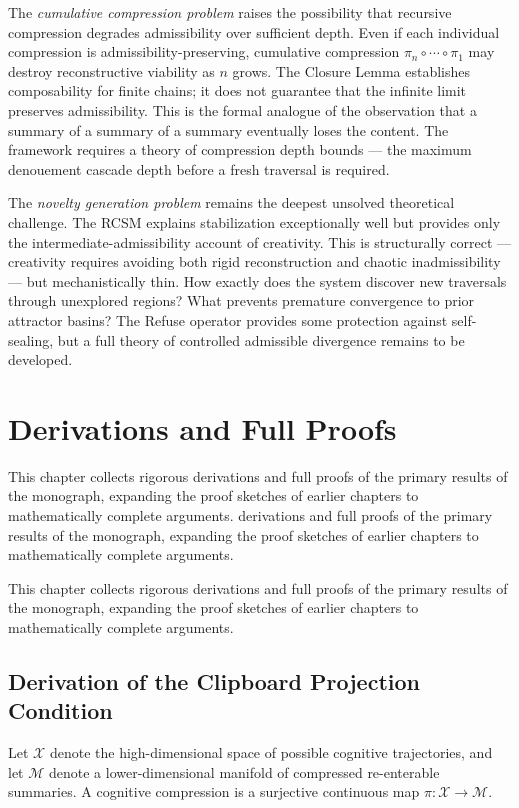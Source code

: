 \documentclass[12pt,oneside]{book}
\theoremstyle{plain}
\theoremstyle{definition}
\theoremstyle{plain}
\newcommand{\cM}{\mathcal{M}}
\newcommand{\cX}{\mathcal{X}}
\begin{document}
The \emph{cumulative compression problem} raises the possibility that recursive compression degrades admissibility over sufficient depth. Even if each individual compression is admissibility-preserving, cumulative compression $\pi_n \circ \cdots \circ \pi_1$ may destroy reconstructive viability as $n$ grows. The Closure Lemma establishes composability for finite chains; it does not guarantee that the infinite limit preserves admissibility. This is the formal analogue of the observation that a summary of a summary of a summary eventually loses the content. The framework requires a theory of compression depth bounds — the maximum denouement cascade depth before a fresh traversal is required.

The \emph{novelty generation problem} remains the deepest unsolved theoretical challenge. The RCSM explains stabilization exceptionally well but provides only the intermediate-admissibility account of creativity. This is structurally correct — creativity requires avoiding both rigid reconstruction and chaotic inadmissibility — but mechanistically thin. How exactly does the system discover new traversals through unexplored regions? What prevents premature convergence to prior attractor basins? The Refuse operator provides some protection against self-sealing, but a full theory of controlled admissible divergence remains to be developed.

\chapter{Derivations and Full Proofs}
\label{ch:derivations}

This chapter collects rigorous derivations and full proofs of the primary results of the monograph, expanding the proof sketches of earlier chapters to mathematically complete arguments. derivations and full proofs of the primary results of the monograph, expanding the proof sketches of earlier chapters to mathematically complete arguments.

This chapter collects rigorous derivations and full proofs of the primary results of the monograph, expanding the proof sketches of earlier chapters to mathematically complete arguments.

\section{Derivation of the Clipboard Projection Condition}

Let $\cX$ denote the high-dimensional space of possible cognitive trajectories, and let $\cM$ denote a lower-dimensional manifold of compressed re-enterable summaries. A cognitive compression is a surjective continuous map $\pi : \cX \to \cM$.
\end{document}
